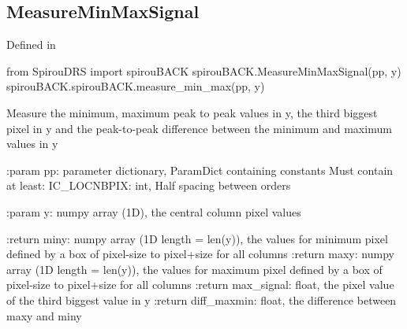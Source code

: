 \noindent\begin{minipage}{\textwidth}
\subsection{MeasureMinMaxSignal}

Defined in \spirouBACK{}

\begin{pythonbox}
from SpirouDRS import spirouBACK
spirouBACK.MeasureMinMaxSignal(pp, y)
spirouBACK.spirouBACK.measure_min_max(pp, y)
\end{pythonbox}

\begin{pythondocstring}
Measure the minimum, maximum peak to peak values in y, the third biggest
pixel in y and the peak-to-peak difference between the minimum and
maximum values in y

:param pp: parameter dictionary, ParamDict containing constants
            Must contain at least:
                IC_LOCNBPIX: int, Half spacing between orders

:param y: numpy array (1D), the central column pixel values

:return miny: numpy array (1D length = len(y)), the values
              for minimum pixel defined by a box of pixel-size to
              pixel+size for all columns
:return maxy: numpy array (1D length = len(y)), the values
              for maximum pixel defined by a box of pixel-size to
              pixel+size for all columns
:return max_signal: float, the pixel value of the third biggest value
                    in y
:return diff_maxmin: float, the difference between maxy and miny
\end{pythondocstring}
\end{minipage}


